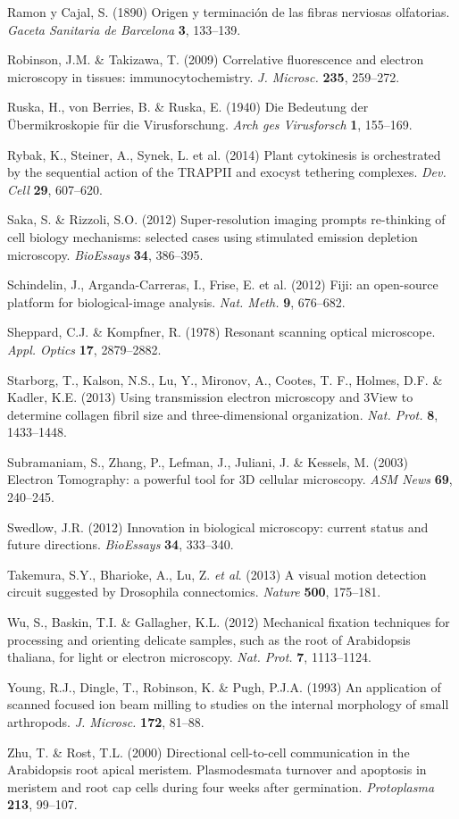 \documentclass{article}
\begin{document}
\begin{hangpars}
Ramon y Cajal, S. (1890) Origen y terminación de las fibras nerviosas olfatorias. \textit{Gaceta Sanitaria de Barcelona} \textbf{3}, 133–139.

Robinson, J.M. \& Takizawa, T. (2009) Correlative fluorescence and electron microscopy in tissues: immunocytochemistry. \textit{J. Microsc.} \textbf{235}, 259–272.

Ruska, H., von Berries, B. \& Ruska, E. (1940) Die Bedeutung der Übermikroskopie für die Virusforschung. \textit{Arch ges Virusforsch} \textbf{1}, 155–169.

Rybak, K., Steiner, A., Synek, L. et al. (2014) Plant cytokinesis is orchestrated by the sequential action of the TRAPPII and exocyst tethering complexes. \textit{Dev. Cell} \textbf{29}, 607–620.

Saka, S. \& Rizzoli, S.O. (2012) Super-resolution imaging prompts re-thinking of cell biology mechanisms: selected cases using stimulated emission depletion microscopy. \textit{BioEssays} \textbf{34}, 386–395.

Schindelin, J., Arganda-Carreras, I., Frise, E. et al. (2012) Fiji: an open-source platform for biological-image analysis. \textit{Nat. Meth.} \textbf{9}, 676–682.

Sheppard, C.J. \& Kompfner, R. (1978) Resonant scanning optical microscope. \textit{Appl. Optics} \textbf{17}, 2879–2882.

Starborg, T., Kalson, N.S., Lu, Y., Mironov, A., Cootes, T. F., Holmes, D.F. \& Kadler, K.E. (2013) Using transmission electron microscopy and 3View to determine collagen fibril size and three-dimensional organization. \textit{Nat. Prot.} \textbf{8}, 1433–1448.

Subramaniam, S., Zhang, P., Lefman, J., Juliani, J. \& Kessels, M. (2003) Electron Tomography: a powerful tool for 3D cellular microscopy. \textit{ASM News} \textbf{69}, 240–245.

Swedlow, J.R. (2012) Innovation in biological microscopy: current status and future directions. \textit{BioEssays} \textbf{34}, 333–340.

Takemura, S.Y., Bharioke, A., Lu, Z. \textit{et al}. (2013) A visual motion detection circuit suggested by Drosophila connectomics. \textit{Nature} \textbf{500}, 175–181.

Wu, S., Baskin, T.I. \& Gallagher, K.L. (2012) Mechanical fixation techniques for processing and orienting delicate samples, such as the root of Arabidopsis thaliana, for light or electron microscopy. \textit{Nat. Prot.} \textbf{7}, 1113–1124.

Young, R.J., Dingle, T., Robinson, K. \& Pugh, P.J.A. (1993) An application of scanned focused ion beam milling to studies on the internal morphology of small arthropods. \textit{J. Microsc.} \textbf{172}, 81–88.

Zhu, T. \& Rost, T.L. (2000) Directional cell-to-cell communication in the Arabidopsis root apical meristem. Plasmodesmata turnover and apoptosis in meristem and root cap cells during four weeks after germination. \textit{Protoplasma} \textbf{213}, 99–107.
\end{hangpars}
\end{document}
